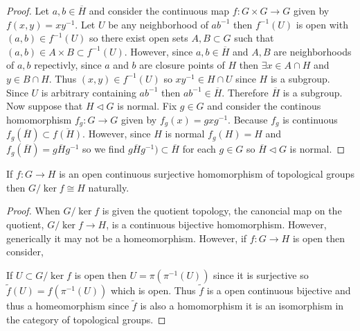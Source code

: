 \documentclass[12pt]{extarticle}
\begin{document}
\begin{proof}
Let $a,b \in \overline{H}$ and consider the continuous map $f : G \times G \to G$ given by $f(x,y) = x y^{-1}$. Let $U$ be any neighborhood of $ab^{-1}$ then $f^{-1}(U)$ is open with $(a, b) \in f^{-1}(U)$ so there exist open sets $A, B \subset G$ such that $(a, b) \in A \times B \subset f^{-1}(U)$. However, since $a, b \in \overline{H}$ and $A,B$ are neighborhoods of $a,b$ repectivly, since $a$ and $b$ are closure points of $H$ then $\exists x \in A \cap H$ and $y \in B \cap H$. Thus $(x, y) \in f^{-1}(U)$ so $xy^{-1} \in H \cap U$ since $H$ is a subgroup. Since $U$ is arbitrary containing $a b^{-1}$ then $a b^{-1} \in \overline{H}$. Therefore $\overline{H}$ is a subgroup. 
\bigskip\\
Now suppose that $H \triangleleft G$ is normal. Fix $g \in G$ and consider the continous homomorphism $f_g : G \to G$ given by $f_g(x) = g x g^{-1}$. Because $f_g$ is continuous $f_g(\overline{H}) \subset \overline{f(H)}$. However, since $H$ is normal $f_g(H) = H$ and $f_g(\overline{H}) = g \overline{H} g^{-1}$ so we find $g \overline{H} g^{-1}) \subset \overline{H}$ for each $g \in G$ so $\overline{H} \triangleleft G$ is normal. 
\end{proof}



\begin{theorem} \label{quotient_condition}
If $f : G \to H$ is an open continuous surjective homomorphism of topological groups then $G / \ker{f} \cong H$ naturally.
\end{theorem}

\begin{proof}
When $G / \ker{f}$ is given the quotient topology, the canoncial map on the quotient, $G / \ker{f} \to H$, is a continuous bijective homomorphism. However, generically it may not be a homeomorphism. However, if $f : G \to H$ is open then consider,
\begin{center}
\end{center}
If $U \subset G / \ker{f}$ is open then $U = \pi(\pi^{-1}(U))$ since it is surjective so $\tilde{f}(U) = f(\pi^{-1}(U))$ which is open. Thus $\tilde{f}$ is a open continuous bijective and thus a homeomorphism since $\tilde{f}$ is also a homomorphism it is an isomorphism in the category of topological groups.
\end{proof}
\end{document}
